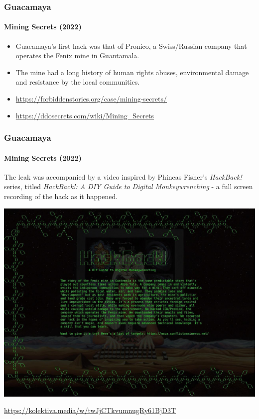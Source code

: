 \documentclass[aspectratio=169,usenames,dvipsnames]{beamer}
\begin{document}
\begin{frame}
  \frametitle{Guacamaya}
  \framesubtitle{Mining Secrets (2022)}

  \begin{itemize}[<+->]
    \item Guacamaya's first hack was that of Pronico, a Swiss/Russian company
      that operates the Fenix mine in Guantamala.
    \item The mine had a long history of human rights abuses, environmental
      damage and resistance by the local communities.
    \item \url{https://forbiddenstories.org/case/mining-secrets/}
    \item \url{https://ddosecrets.com/wiki/Mining_Secrets}
  \end{itemize}
\end{frame}

\begin{frame}
  \frametitle{Guacamaya}
  \framesubtitle{Mining Secrets (2022)}

  \footnotesize
  The leak was accompanied by a video inspired by Phineas Fisher's
  \emph{HackBack!} series, titled \emph{HackBack!: A DIY Guide to Digital
  Monkeywrenching} - a full screen recording of the hack as it happened.

  \vfill \centering
  \includegraphics[width=\textwidth,height=0.6\textheight,keepaspectratio]{img/hackback_guacamaya.jpg}

  \url{https://kolektiva.media/w/twJjCTkvumnugRy61BjD3T}
\end{frame}
\end{document}
